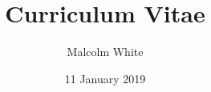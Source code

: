 \documentclass{cv}
\title{Curriculum Vitae}
\author{Malcolm White}
\date{11 January 2019}
\begin{document}
	
    \printDocumentHeader
	
	
	
	
	
	
	
	
\end{document}
